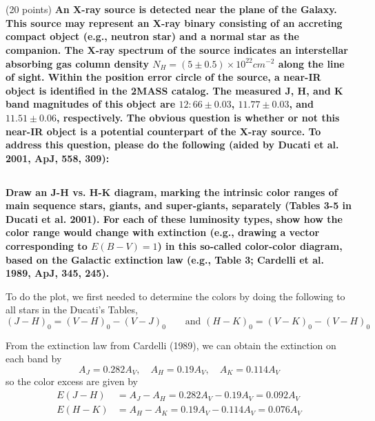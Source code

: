 \section{}(20 points)
\textbf{An X-ray source is detected near the plane of the Galaxy. 
This source may represent an X-ray binary consisting of an accreting compact object (e.g., neutron star) and a normal star as the companion.
The X-ray spectrum of the source indicates an interstellar absorbing gas column density $N_H = (5 \pm 0.5) \times 10^{22} cm^{-2}$ along the line of sight.
Within the position error circle of the source, a near-IR object is identified in the 2MASS catalog.
The measured J, H, and K band magnitudes of this object are
$12:66\pm0.03$, $11.77\pm0.03$, and $11.51\pm0.06$, respectively.
The obvious question is whether or not this near-IR object is a potential counterpart of the X-ray source.
To address this question, please do the following (aided by Ducati et al. 2001, ApJ, 558, 309):}
\subsection{}
\textbf{Draw an J-H vs. H-K diagram, marking the intrinsic color ranges of main sequence stars, giants, and super-giants, separately (Tables 3-5 in Ducati et al. 2001).
For each of these luminosity types, show how the color range would change with extinction (e.g., drawing a vector corresponding to $E(B-V)=1$) in this so-called color-color diagram, based on the Galactic extinction law (e.g., Table 3; Cardelli et al. 1989, ApJ, 345, 245).}

To do the plot, we first needed to determine the colors by doing the following to all stars in the Ducati's Tables,
\begin{equation*}
    (J-H)_0 = (V-H)_0 - (V-J)_0\qquad\text{and }
    (H-K)_0 = (V-K)_0 - (V-H)_0
\end{equation*}

From the extinction law from Cardelli (1989), we can obtain the extinction on each band by
\begin{equation*}
    A_J = 0.282A_V,\quad A_H = 0.19A_V,\quad A_K = 0.114A_V
\end{equation*}
so the color excess are given by
\begin{align*}
    E(J-H) &= A_J - A_H = 0.282A_V - 0.19A_V = 0.092A_V\\
    E(H-K) &= A_H - A_K = 0.19A_V - 0.114A_V = 0.076A_V
\end{align*}

